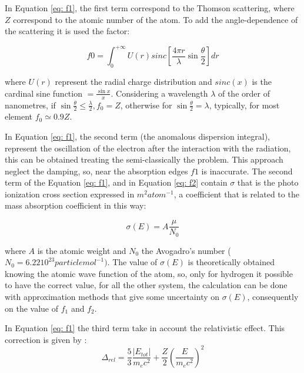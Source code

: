 \begin{flushleft}
In Equation \ref{eq: f1}, the first term correspond to the Thomson scattering, where $Z $ correspond to the atomic number of the atom. To add the angle-dependence of the scattering it is used the factor:
\end{flushleft}

\begin{equation}
f0 = \int_{0}^{+ \infty} U(r) sinc \left[ \frac{4 \pi r}{\lambda} \sin \frac{\theta}{2} \right] dr
\label{f0}
\end{equation}

\begin{flushleft}
where $U(r) $ represent the radial charge distribution and $sinc(x)$ is the cardinal sine function $ = \frac{\sin x}{x} $. Considering a wavelength $\lambda $ of the order of nanometres, if $\sin \frac{\theta}{2} \leq \frac{\lambda}{2}, f_0=Z $, otherwise for $\sin \frac{\theta}{2}=\lambda$, typically, for most element $ f_0 \simeq 0.9Z $.
\end{flushleft}
In Equation \ref{eq: f1}, the second term (the anomalous dispersion integral), represent the oscillation of the electron after the interaction with the radiation, this can be obtained treating the semi-classically the problem. This approach neglect the damping, so, near the absorption edges $f1 $ is inaccurate. The second term of the Equation \ref{eq: f1}, and in Equation \ref{eq: f2} contain $\sigma $ that is the photo ionization cross section expressed in $m^2 atom ^{-1} $, a coefficient that is related to the mass absorption coefficient in this way: 

\begin{equation}
\sigma(E) = A \frac{\mu}{N_0}
\label{eq: sigma}
\end{equation}

\begin{flushleft}
where $A $ is the atomic weight and $N_0 $ the Avogadro's number ($N_0 = 6.22  10^{23} particle mol^{-1}) $. The value of $\sigma(E) $ is theoretically obtained knowing the atomic wave function of the atom, so, only for hydrogen it possible to have the correct value, for all the other system, the calculation can be done with approximation methods that give some uncertainty on $\sigma(E) $, consequently on the value of $f_1 $ and $f_2 $.
\end{flushleft}
In Equation \ref{eq: f1} the third term take in account the relativistic effect. This correction is given by \cite{cromer1970relativistic}:
\begin{equation}
\Delta_{rel} = \frac{5}{3} \frac{|E_{tot}|}{m_e c^2} + \frac{Z}{2} \left( \frac{E}{m_e c^2} \right)^2
\label{eq: Delta_rel}
\end{equation}

